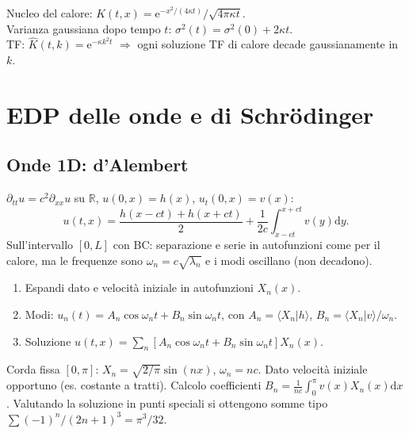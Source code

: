 \documentclass[11pt,a4paper,openany]{book}
\theoremstyle{definition}
\newcommand{\R}{\mathbb{R}}
\newcommand{\braket}[2]{\langle#1|#2\rangle}
\newcommand{\dd}{\mathrm{d}}
\newcommand{\eu}{\mathrm{e}}
\begin{document}
\begin{formulario}
Nucleo del calore: $K(t,x)=\eu^{-x^2/(4\kappa t)}/\sqrt{4\pi\kappa t}$.\\
Varianza gaussiana dopo tempo $t$: $\sigma^2(t)=\sigma^2(0)+2\kappa t$.\\
TF: $\hat K(t,k)=\eu^{-\kappa k^2 t}$ $\Rightarrow$ ogni soluzione TF di calore decade gaussianamente in $k$.
\end{formulario}

\chapter{EDP delle onde e di Schr\"odinger}

\section{Onde 1D: d'Alembert}

\begin{teoria}
$\partial_{tt}u=c^2\partial_{xx}u$ su $\R$, $u(0,x)=h(x)$, $u_t(0,x)=v(x)$:
$$u(t,x)=\frac{h(x-ct)+h(x+ct)}{2}+\frac{1}{2c}\int_{x-ct}^{x+ct}v(y)\dd y.$$
Sull'intervallo $[0,L]$ con BC: separazione e serie in autofunzioni come per il calore, ma le frequenze sono $\omega_n=c\sqrt{\lambda_n}$ e i modi oscillano (non decadono).
\end{teoria}

\begin{algoritmo}[{Onde su $[0,L]$}]
\begin{enumerate}
\item Espandi dato e velocit\`a iniziale in autofunzioni $X_n(x)$.
\item Modi: $u_n(t)=A_n\cos\omega_n t+B_n\sin\omega_n t$, con $A_n=\braket{X_n}{h}$, $B_n=\braket{X_n}{v}/\omega_n$.
\item Soluzione $u(t,x)=\sum_n[A_n\cos\omega_n t+B_n\sin\omega_n t]X_n(x)$.
\end{enumerate}
\end{algoritmo}

\begin{esempio}[Scritto 20/01/2026, Es. 4]
Corda fissa $[0,\pi]$: $X_n=\sqrt{2/\pi}\sin(nx)$, $\omega_n=n c$. Dato velocit\`a iniziale opportuno (es. costante a tratti). Calcolo coefficienti $B_n=\frac{1}{nc}\int_0^\pi v(x)X_n(x)\dd x$. Valutando la soluzione in punti speciali si ottengono somme tipo $\sum(-1)^n/(2n+1)^3=\pi^3/32$.
\end{esempio}
\end{document}
